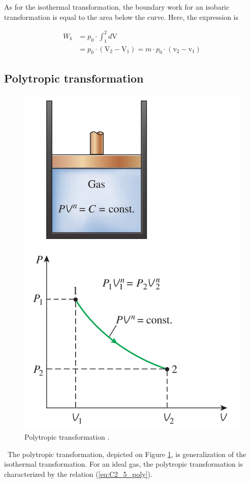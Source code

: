 As for the isothermal transformation, the boundary work for an isobaric transformation is equal to the area below the curve. Here, the expression is

\begin{align}
  W_b &= p_0\cdot \int_1^2d\mathrm{V}\nonumber\\
   &= p_0\cdot (\mathrm{V_2} - \mathrm{V_1}) = m\cdot p_0\cdot (\mathrm{v_2} - \mathrm{v_1})
\end{align}
\newpage

\subsection{Polytropic transformation}
\begin{figure}
  \centering
  \includegraphics{poly.png}
  \caption{Polytropic transformation \cite{2015}.}
  \label{fig:C2_5_poly}
\end{figure}
\quad\ The polytropic transformation, depicted on Figure \ref{fig:C2_5_poly}, is  generalization of the isothermal transformation. For an ideal gas, the polytropic transformation is characterized by the relation (\ref{eq:C2_5_poly}).

